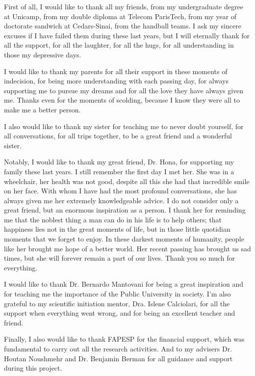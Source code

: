 

First of all, I would like to thank all my friends, from my undergraduate degree at Unicamp, from my double diploma at Telecom ParisTech, from my year of doctorate sandwich at Cedars-Sinai, from the handball teams. I ask my sincere excuses if I have failed them during these last years, but I will eternally thank for all the support, for all the laughter, for all the hugs, for all understanding in those my depressive days.

I would like to thank my parents for all their support in these moments of indecision, for being more understanding with each passing day, for always supporting me to pursue my dreams and for all the love they have always given me. Thanks even for the moments of scolding, because I know they were all to make me a better person.

I also would like to thank my sister for teaching me to never doubt yourself,
for all conversations, for all trips together, to be a great friend and a wonderful sister.

Notably, I would like to thank my great friend, Dr. Hona, for supporting my family these last years.
I still remember the first day I met her. She was in a wheelchair, her health was not good, despite all this she had that incredible smile on her face. With whom I have had the most  profound conversations, she has always given me her extremely knowledgeable advice. I do not consider only a great friend, but an enormous inspiration as a person. I thank her for reminding me that the noblest thing a man can do in his life is to help others; that happiness lies not in the great moments of life, but in those little quotidian moments that we forget to enjoy. In these darkest moments of humanity, people like her brought me hope of a better world. Her recent passing has brought us sad times, but she will forever remain a part of our lives. Thank you so much for everything.

I would like to thank  Dr. Bernardo Mantovani for being a great inspiration and for teaching me the importance of the Public University in society. I'm also grateful to my scientific initiation mentor, Dra. Islene Calciolari, for all the support when everything went wrong, and for being an excellent teacher and friend.

Finally, I also would like to thank FAPESP for the financial support,
which was fundamental to carry out all the research activities.
And to my advisers Dr. Houtan Noushmehr and Dr. Benjamin Berman
for all guidance and support during this project.\\
